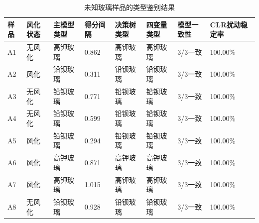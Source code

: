 \begin{table}[H]
  \centering
  \caption{未知玻璃样品的类型鉴别结果}
  \label{tab:p3-prediction}
  \small
  \begin{tabularx}{\textwidth}{C{0.9cm} C{1.3cm} C{1.5cm} C{1.1cm} C{1.5cm} C{1.5cm} C{1.4cm} Y}
    \toprule
    样品 & 风化状态 & 主模型类型 & 得分间隔 & 决策树类型 & 四变量类型 & 模型一致性 & CLR扰动稳定率 \\
    \midrule
    A1 & 无风化 & 高钾玻璃 & 0.862 & 高钾玻璃 & 高钾玻璃 & 3/3一致 & 100.00\% \\
    A2 & 风化 & 铅钡玻璃 & 0.311 & 铅钡玻璃 & 铅钡玻璃 & 3/3一致 & 100.00\% \\
    A3 & 无风化 & 铅钡玻璃 & 0.771 & 铅钡玻璃 & 铅钡玻璃 & 3/3一致 & 100.00\% \\
    A4 & 无风化 & 铅钡玻璃 & 0.599 & 铅钡玻璃 & 铅钡玻璃 & 3/3一致 & 100.00\% \\
    A5 & 风化 & 铅钡玻璃 & 0.294 & 铅钡玻璃 & 铅钡玻璃 & 3/3一致 & 100.00\% \\
    A6 & 风化 & 高钾玻璃 & 0.871 & 高钾玻璃 & 高钾玻璃 & 3/3一致 & 100.00\% \\
    A7 & 风化 & 高钾玻璃 & 1.015 & 高钾玻璃 & 高钾玻璃 & 3/3一致 & 100.00\% \\
    A8 & 无风化 & 铅钡玻璃 & 0.928 & 铅钡玻璃 & 铅钡玻璃 & 3/3一致 & 100.00\% \\
    \bottomrule
  \end{tabularx}
\end{table}


